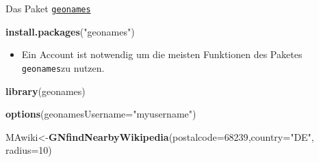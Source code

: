 \documentclass[ignorenonframetext,]{beamer}
\newenvironment{Shaded}{\begin{snugshade}}{\end{snugshade}}
\newcommand{\KeywordTok}[1]{\textcolor[rgb]{0.13,0.29,0.53}{\textbf{#1}}}
\newcommand{\DataTypeTok}[1]{\textcolor[rgb]{0.13,0.29,0.53}{#1}}
\newcommand{\DecValTok}[1]{\textcolor[rgb]{0.00,0.00,0.81}{#1}}
\newcommand{\StringTok}[1]{\textcolor[rgb]{0.31,0.60,0.02}{#1}}
\newcommand{\NormalTok}[1]{#1}
\providecommand{\tightlist}{%
  \setlength{\itemsep}{0pt}\setlength{\parskip}{0pt}}
\begin{document}
\begin{frame}[fragile]{Das Paket
\href{https://github.com/ropensci/geonames}{\texttt{geonames}}}

\begin{Shaded}
\begin{Highlighting}[]
\KeywordTok{install.packages}\NormalTok{(}\StringTok{"geonames"}\NormalTok{)}
\end{Highlighting}
\end{Shaded}

\begin{itemize}
\tightlist
\item
  Ein Account ist notwendig um die meisten Funktionen des Paketes
  \texttt{geonames}zu nutzen.
\end{itemize}

\begin{Shaded}
\begin{Highlighting}[]
\KeywordTok{library}\NormalTok{(geonames)}
\end{Highlighting}
\end{Shaded}

\begin{Shaded}
\begin{Highlighting}[]
\KeywordTok{options}\NormalTok{(}\DataTypeTok{geonamesUsername=}\StringTok{"myusername"}\NormalTok{)}
\end{Highlighting}
\end{Shaded}

\begin{Shaded}
\begin{Highlighting}[]
\NormalTok{MAwiki<-}\KeywordTok{GNfindNearbyWikipedia}\NormalTok{(}\DataTypeTok{postalcode=}\DecValTok{68239}\NormalTok{,}\DataTypeTok{country=}\StringTok{"DE"}\NormalTok{,}
                              \DataTypeTok{radius=}\DecValTok{10}\NormalTok{)}
\end{Highlighting}
\end{Shaded}

\end{frame}
\end{document}
